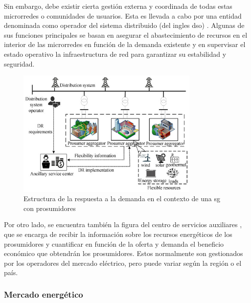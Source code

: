 \vspace{3mm}
\pagebreak

Sin embargo, debe existir cierta gestión externa y coordinada de todas estas microrredes o comunidades de usuarios. Esta es llevada a cabo por una entidad denominada como operador del sistema distribuido (del ingles \gls{dso}) \cite{transactive} \cite{dso}. Algunas de sus funciones principales se basan en asegurar el abastecimiento de recursos en el interior de las microrredes en función de la demanda existente y en supervisar el estado operativo la infraestructura de red para garantizar su estabilidad y seguridad. 

\vspace{3mm}

\begin{figure}[h!]
  \centering
  \includegraphics[width=0.8\textwidth]{img/teoria/prosumer.jpg}
  \caption{Estructura de la respuesta a la demanda en el contexto de una \acrshort{sg} con prosumidores \cite{transactive}}
  \label{fig:prosumer}
\end{figure}

\vspace{3mm}

Por otro lado, se encuentra también la figura del centro de servicios auxiliares \cite{transactive}, que se encarga de recibir la información sobre los recursos energéticos de los prosumidores y cuantificar en función de la oferta y demanda el beneficio económico que obtendrán los prosumidores. Estos normalmente son gestionados por los operadores del mercado eléctrico, pero puede variar según la región o el país.

\vspace{3mm}

\subsubsection{Mercado energético}

